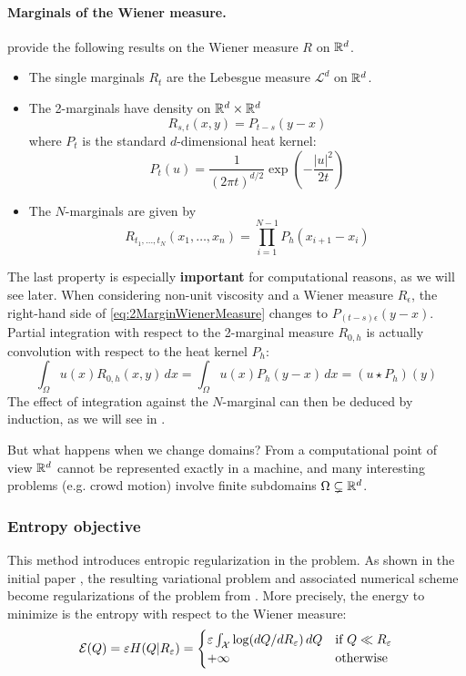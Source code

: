 \documentclass[../report.tex]{subfiles}
\begin{document}
\paragraph{Marginals of the Wiener measure.} \textcite{benamou2018entropy} provide the following results on the Wiener measure $R$ on $\mathbb{R}^d$.
\begin{itemize}
	\item The single marginals $R_t$ are the Lebesgue measure $\mathcal{L}^d$ on $\mathbb{R}^d$.
	\item The 2-marginals have density on $\mathbb{R}^d \times \mathbb{R}^d$
	\begin{equation}\label{eq:2MarginWienerMeasure}
		R_{s,t}(x,y) = P_{t-s}(y-x)
	\end{equation}
	where $P_t$ is the standard $d$-dimensional heat kernel:
	\begin{equation}\label{eq:StandardDHeatKernel}
		P_t(u) =
		\frac{1}{(2\pi t)^{d/2}} \exp\left(
		-\frac{|u|^2}{2t}
		\right)
	\end{equation}
	\item The $N$-marginals are given by
	\begin{equation}
		R_{t_1,\ldots,t_N}(x_1,\ldots,x_n) = 
		\prod_{i=1}^{N-1}
		P_{h}(x_{i+1}-x_i)
	\end{equation}
\end{itemize}
The last property is especially \textbf{important} for computational reasons, as we will see later. When considering non-unit viscosity and a Wiener measure $R_\epsilon$, the right-hand side of \eqref{eq:2MarginWienerMeasure} changes to $P_{(t-s)\epsilon}(y-x)$. Partial integration with respect to the 2-marginal measure $R_{0,h}$ is actually convolution with respect to the heat kernel $P_h$:
\[
	\int_\Omega u(x) R_{0,h}(x,y)\,dx =
	\int_\Omega u(x) P_h(y-x)\,dx =
	(u \star P_h)(y)
\]
The effect of integration against the $N$-marginal can then be deduced by induction, as we will see in .


But what happens when we change domains? From a computational point of view $\mathbb{R}^d$ cannot be represented exactly in a machine, and many interesting problems (e.g. crowd motion) involve finite subdomains $\Omega \subsetneq \mathbb{R}^d$.


\subsubsection{Entropy objective}

This method introduces entropic regularization in the problem. As shown in the initial paper \cite{benamou2018entropy}, the resulting variational problem and associated numerical scheme become regularizations of the problem from \cite{benamou:hal-01295299,benamou2015lagrangian}.
More precisely, the energy to minimize is the entropy with respect to the Wiener measure:
\begin{equation}
	\mathcal{E}(Q) = \varepsilon H(Q | R_\varepsilon) =
	\begin{cases}
	\varepsilon \int_{\mathcal{X}} \log(dQ/dR_\varepsilon)\, dQ
	& \mbox{if } Q \ll R_\varepsilon  \\
	+\infty & \mbox{otherwise}
	\end{cases}
\end{equation}
\end{document}
